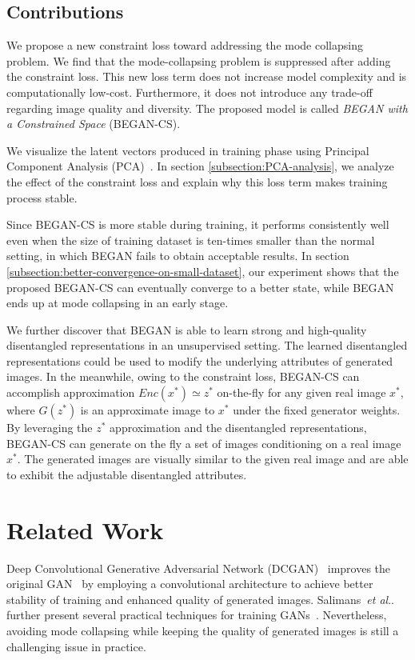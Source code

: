 \documentclass[runningheads]{llncs}
\makeatletter
\DeclareRobustCommand\onedot{\futurelet\@let@token\@onedot}
\def\@onedot{\ifx\@let@token.\else.\null\fi\xspace}
\def\etal{\emph{et al}\onedot}
\makeatother
\begin{document}
    
    \subsection{Contributions}
    
    We propose a new constraint loss toward addressing the mode collapsing problem. We find that the mode-collapsing problem is suppressed after adding the constraint loss. This new loss term does not increase model complexity and is computationally low-cost. Furthermore, it does not introduce any trade-off regarding image quality and diversity. 
    The proposed model is called \emph{BEGAN with a Constrained Space} (BEGAN-CS).
   
    
    We visualize the latent vectors produced in training phase using Principal Component Analysis (PCA)~\cite{PCA}. In section \ref{subsection:PCA-analysis}, we analyze the effect of the constraint loss and explain why this loss term makes training process stable.
    
    Since BEGAN-CS is more stable during training, it performs consistently well even when the size of training dataset is ten-times smaller than the normal setting, in which BEGAN fails to obtain acceptable results. In section \ref{subsection:better-convergence-on-small-dataset}, our experiment shows that the proposed BEGAN-CS can eventually converge to a better state, while BEGAN ends up at mode collapsing in an early stage.
    
    We further discover that BEGAN is able to learn strong and high-quality disentangled representations in an unsupervised setting. The learned disentangled representations could be used to modify the underlying attributes of generated images. In the meanwhile, owing to the constraint loss, BEGAN-CS can accomplish approximation $Enc(x^*) \simeq z^*$ on-the-fly for any given real image $x^*$, where $G(z^*)$ is an approximate image to $x^*$ under the fixed generator weights. 
    By leveraging the $z^*$ approximation and the disentangled representations, BEGAN-CS can generate on the fly a set of images conditioning on a real image $x^*$. The generated images are visually similar to the given real image and are able to exhibit the adjustable disentangled attributes.
    

\section{Related Work} 
    
    Deep Convolutional Generative Adversarial Network (DCGAN)~\cite{DCGAN} improves the original GAN~\cite{GAN} by employing a convolutional architecture to achieve better stability of training and enhanced quality of generated images. Salimans~\etal further present several practical techniques for training GANs~\cite{SalimansGZCRCC16}. Nevertheless, avoiding mode collapsing while keeping the quality of generated images is still a challenging issue in practice. 
     
\end{document}
